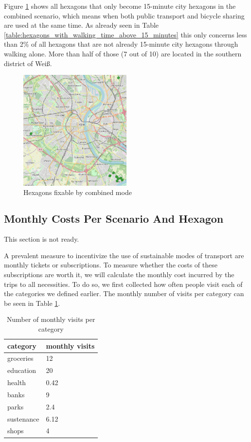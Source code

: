 Figure \ref{fig:combined_hexagons} shows all hexagons that only become 15-minute city hexagons in the combined scenario, which means when both public transport and bicycle sharing are used at the same time.
As already seen in Table \ref{table:hexagons_with_walking_time_above_15_minutes} this only concerns less than 2\% of all hexagons that are not already 15-minute city hexagons through walking alone.
More than half of those (7 out of 10) are located in the southern district of Weiß.
\begin{figure}
  \begin{center}
    \includegraphics[width=0.50\textwidth]{Figures/results/problematic_hexagons/combined_hexagons}
  \end{center}
  \caption{Hexagons fixable by combined mode}
  \label{fig:combined_hexagons}
\end{figure}


\subsection{Monthly Costs Per Scenario And Hexagon}
This section is not ready.


A prevalent measure to incentivize the use of sustainable modes of transport are monthly tickets or subscriptions.
To measure whether the costs of these subscriptions are worth it, we will calculate the monthly cost incurred by the trips to all necessities.
To do so, we first collected how often people visit each of the categories we defined earlier.
The monthly number of visits per category can be seen in Table \ref{tab:monthly_visits}.

\begin{table}
  \caption{Number of monthly visits per category}
  \label{tab:monthly_visits}
  \begin{center}
    \begin{tabular}[c]{l|l}
      category & monthly visits \\
      \hline
      groceries & 12 \\
      education & 20 \\
      health & 0.42 \\
      banks & 9 \\
      parks & 2.4 \\
      sustenance & 6.12 \\
      shops & 4 \\
      \hline
    \end{tabular}
  \end{center}
\end{table}

